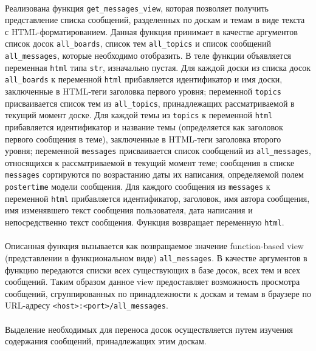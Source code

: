\documentclass[12pt, a4paper, oneside]{article}
\begin{document}
            \paragraph{}
            Реализована функция \texttt{get\_messages\_view}, которая позволяет получить представление списка сообщений, разделенных по доскам и темам в виде текста с HTML-форматированием. Данная функция принимает в качестве аргументов список досок \texttt{all\_boards}, список тем \texttt{all\_topics} и список сообщений \texttt{all\_messages}, которые необходимо отобразить. В теле функции объявляется переменная \texttt{html} типа \texttt{str}, изначально пустая. Для каждой доски из списка досок \texttt{all\_boards} к переменной \texttt{html} прибавляется идентификатор и имя доски, заключенные в HTML-теги заголовка первого уровня; переменной \texttt{topics} присваивается список тем из \texttt{all\_topics}, принадлежащих рассматриваемой в текущий момент доске. Для каждой темы из \texttt{topics} к переменной \texttt{html} прибавляется идентификатор и название темы (определяется как заголовок первого сообщения в теме), заключенные в HTML-теги заголовка второго уровня; переменной \texttt{messages} присваивается список сообщений из \texttt{all\_messages}, относящихся к рассматриваемой в текущий момент теме; сообщения в списке \texttt{messages} сортируются по возрастанию даты их написания, определяемой полем \texttt{postertime} модели сообщения. Для каждого сообщения из \texttt{messages} к переменной \texttt{html} прибавляется идентификатор, заголовок, имя автора сообщения, имя изменявшего текст сообщения пользователя, дата написания и непосредственно текст сообщения. Функция возвращает переменную \texttt{html}.
            \paragraph{}
            Описанная функция вызывается как возвращаемое значение function-based view (представлении в функциональном виде) \texttt{all\_messages}. В качестве аргументов в функцию передаются списки всех существующих в базе досок, всех тем и всех сообщений. Таким образом данное view предоставляет возможность просмотра сообщений, сгруппированных по принадлежности к доскам и темам в браузере по URL-адресу \texttt{<host>:<port>/all\_messages}.
            \paragraph{}
            Выделение необходимых для переноса досок осуществляется путем изучения содержания сообщений, принадлежащих этим доскам.
    \newpage
    
\end{document}
